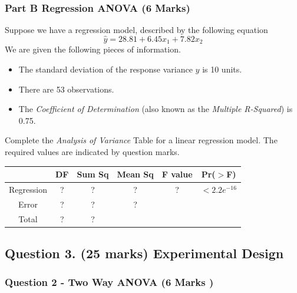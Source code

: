 \documentclass[a4paper,12pt]{article}
\begin{document}
\subsubsection*{Part B Regression ANOVA (6 Marks)}
Suppose we have a regression model, described by the following equation
\[ \hat{y} = 28.81 + 6.45x_1 + 7.82 x_2\]
We are given the following pieces of information.
\begin{itemize}
	\item The standard deviation of the response variance $y$ is 10 units.
	\item There are 53 observations.
	\item The \textit{Coefficient of Determination} (also known as the \textit{Multiple R-Squared}) is 0.75.
\end{itemize}
Complete the \textit{Analysis of Variance} Table for a linear regression model.
The required values are indicated by question marks.

\begin{center}
	\begin{tabular}{|c|c|c|c|c|c|} \hline
		\phantom{makespace}	& DF & 	Sum Sq &	Mean Sq &	F value &   	Pr($>$F)    \\ \hline
		Regression &  \phantom{make}?\phantom{make} &	? &	? &	 ? &	$< 2.2e^{-16}$ \\ \hline
		Error  & ? &	? &  	?   &            &       \\ \hline
		Total  & ?  &	? &  \phantom{makespace}	  &   \phantom{makespace}         &    \phantom{makespace}    \\ \hline
	\end{tabular} 
\end{center}



\subsection*{Question 3. (25 marks) Experimental Design }


\subsubsection*{Question 2 - Two Way ANOVA (6 Marks )}
\end{document}
